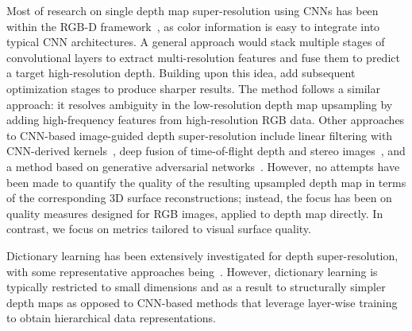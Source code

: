 Most of research on single depth map super-resolution using CNNs has been within the RGB-D framework~\cite{li2016deep,song2016deep,xiao2018joint,riegler2016deep}, as color information is easy to integrate into typical CNN architectures. A general approach would stack multiple stages of convolutional layers to extract multi-resolution features and fuse them to predict a target high-resolution depth. Building upon this idea, \cite{riegler2016deep,song2016deep} add subsequent optimization stages to produce sharper results. The method \cite{hui2016depth} follows a similar approach: it resolves ambiguity in the low-resolution depth map upsampling by adding high-frequency features from high-resolution RGB data. Other approaches to CNN-based image-guided depth super-resolution include linear filtering with CNN-derived kernels~\cite{kim2018deformable}, deep fusion of time-of-flight depth and stereo images~\cite{agresti2017deep}, and a method based on generative adversarial networks~\cite{zhao2017simultaneously}. However, no attempts have been made to quantify the quality of the resulting upsampled depth map in terms of the corresponding 3D surface reconstructions; instead, the focus has been on quality measures designed for RGB images, applied to depth map directly. In contrast, we focus on metrics tailored to visual surface quality.


Dictionary learning has been extensively investigated for depth super-resolution, with some representative approaches being~\cite{ferstl2015variational,gu2017learning,li2018depth}.  However, dictionary learning is typically restricted to small dimensions and as a result to structurally simpler depth maps as opposed to CNN-based methods that leverage layer-wise training to obtain hierarchical data representations.


